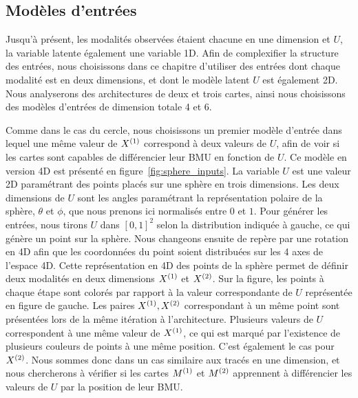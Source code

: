\documentclass[../main]{subfiles}
\begin{document}
\subsection{Modèles d'entrées}

Jusqu'à présent, les modalités observées étaient chacune en une dimension et $U$, la variable latente également une variable 1D.
Afin de complexifier la structure des entrées, nous choisissons dans ce chapitre d'utiliser des entrées dont chaque modalité est en deux dimensions, et dont le modèle latent $U$ est également 2D.
Nous analyserons des architectures de deux et trois cartes, ainsi nous choisissons des modèles d'entrées de dimension totale 4 et 6.

Comme dans le cas du cercle, nous choisissons un premier modèle d'entrée dans lequel une même valeur de $X^{({1})}$ correspond à deux valeurs de $U$, afin de voir si les cartes sont capables de différencier leur BMU en fonction de $U$.
Ce modèle en version 4D est présenté en figure~\ref{fig:sphere_inputs}. La variable $U$ est une valeur 2D paramétrant des points placés sur une sphère en trois dimensions.
Les deux dimensions de $U$ sont les angles paramétrant la représentation polaire de la sphère, $\theta$ et $\phi$, que nous prenons ici normalisés entre $0$ et $1$.
Pour générer les entrées, nous tirons $U$ dans $[0,1]^2$ selon la distribution indiquée à gauche, ce qui génère un point sur la sphère.
Nous changeons ensuite de repère par une rotation en 4D afin que les coordonnées du point soient distribuées sur les 4 axes de l'espace 4D.
Cette représentation en 4D des points de la sphère permet de définir deux modalités en deux dimensions $X^{({1})}$ et $X^{({2})}$. Sur la figure, les points à chaque étape sont colorés par rapport à la valeur correspondante de $U$ représentée en figure de gauche.
Les paires $X^{({1})}, X^{({2})}$ correspondant à un même point sont présentées lors de la même itération à l'architecture.
Plusieurs valeurs de $U$ correspondent à une même valeur de $X^{({1})}$, ce qui est marqué par l'existence de plusieurs couleurs de points à une même position. C'est également le cas pour $X^{({2})}$.
Nous sommes donc dans un cas similaire aux tracés en une dimension, et nous chercherons à vérifier si les cartes $M^{({1})}$ et $M^{({2})}$ apprennent à différencier les valeurs de $U$ par la position de leur BMU.
\end{document}
